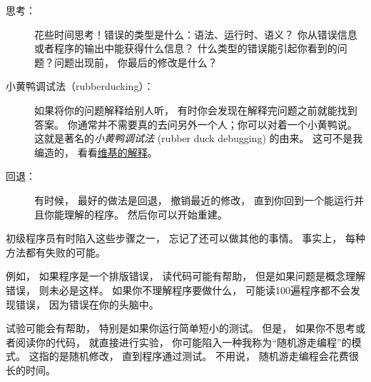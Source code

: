 {\begin{description}
\item [思考：]    花些时间思考！错误的类型是什么：语法、运行时、语义？
    你从错误信息或者程序的输出中能获得什么信息？
    什么类型的错误能引起你看到的问题？问题出现前， 你最后的修改是什么？

\item [小黄鸭调试法（rubberducking）：]如果将你的问题解释给别人听， 有时你会发现在解释完问题之前就能找到答案。  
    你通常并不需要真的去问另外一个人；你可以对着一个小黄鸭说。  
    这就是著名的{\em 小黄鸭调试法} (rubber duck
    debugging) 的由来。   这可不是我编造的， 看看\href{https://en.wikipedia.org/wiki/Rubber_duck_debugging}{维基的解释}。  

\item [回退：]有时候， 最好的做法是回退， 撤销最近的修改， 
    直到你回到一个能运行并且你能理解的程序。  然后你可以开始重建。  

\end{description}



初级程序员有时陷入这些步骤之一， 忘记了还可以做其他的事情。  
事实上， 每种方法都有失败的可能。  



例如， 如果程序是一个排版错误， 读代码可能有帮助， 
但是如果问题是概念理解错误， 则未必是这样。  
如果你不理解程序要做什么， 可能读100遍程序都不会发现错误， 因为错误在你的头脑中。  



试验可能会有帮助， 特别是如果你运行简单短小的测试。  
但是， 如果你不思考或者阅读你的代码， 就直接进行实验， 
你可能陷入一种我称为“随机游走编程”的模式。  
这指的是随机修改， 直到程序通过测试。  
不用说， 随机游走编程会花费很长的时间。  

}
